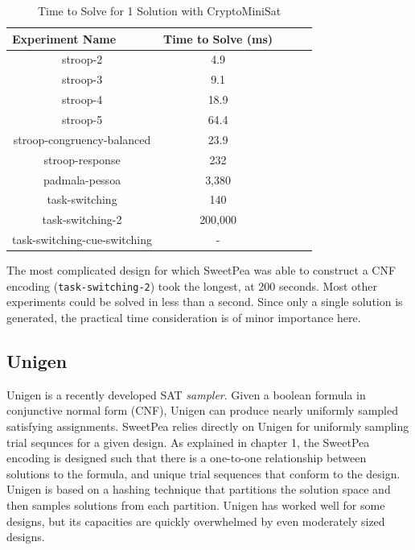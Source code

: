 
\begin{table}[htb]
  \centering
  \caption{Time to Solve for 1 Solution with CryptoMiniSat}
\begin{tabular}{|c|c|c|c|c|}
\hline
\multicolumn{1}{|l|}{Experiment Name} & Time to Solve (ms)  \\ \hline
stroop-2                              & 4.9                 \\ \hline
stroop-3                              & 9.1                 \\ \hline
stroop-4                              & 18.9                \\ \hline
stroop-5                              & 64.4                \\ \hline
stroop-congruency-balanced            & 23.9                \\ \hline
stroop-response                       & 232                 \\ \hline
padmala-pessoa                        & 3,380               \\ \hline
task-switching                        & 140                 \\ \hline
task-switching-2                      & 200,000             \\ \hline
task-switching-cue-switching          & -                   \\ \hline
\end{tabular}
\label{tab:benchmark_experiments_cmsat}%
\end{table}

The most complicated design for which SweetPea was able to construct a CNF encoding (\texttt{task-switching-2}) took the longest, at 200 seconds. Most other experiments could be solved in less than a second. Since only a single solution is generated, the practical time consideration is of minor importance here.


\subsection{Unigen}

Unigen \cite{chakraborty2013scalable,chakraborty_balancing_2014} is a recently developed SAT \textit{sampler}. Given a boolean formula in conjunctive normal form (CNF), Unigen can produce nearly uniformly sampled satisfying assignments. SweetPea relies directly on Unigen for uniformly sampling trial sequnces for a given design. As explained in chapter 1, the SweetPea encoding is designed such that there is a one-to-one relationship between solutions to the formula, and unique trial sequences that conform to the design. Unigen is based on a hashing technique that partitions the solution space and then samples solutions from each partition. Unigen has worked well for some designs, but its capacities are quickly overwhelmed by even moderately sized designs.


